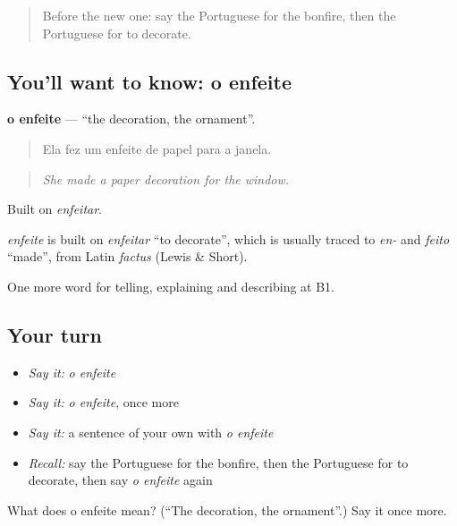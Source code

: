 \label{lesson:PT-C322-enfeite}



\begin{quote}
Before the new one: say the Portuguese for the bonfire, then the Portuguese for to decorate.
\end{quote}

\subsection*{You'll want to know: o enfeite}
\textbf{o enfeite} — \textquotedblleft{}the decoration, the ornament\textquotedblright{}.

\begin{quote}
Ela fez um enfeite de papel para a janela.
\end{quote}

\begin{quote}
\emph{She made a paper decoration for the window.}
\end{quote}

Built on \emph{enfeitar}.

\begin{cousinweb}
\emph{enfeite} is built on \emph{enfeitar} \textquotedblleft{}to decorate\textquotedblright{}, which is usually traced to \emph{en-} and \emph{feito} \textquotedblleft{}made\textquotedblright{}, from Latin \emph{factus} (Lewis \& Short).
\end{cousinweb}

\begin{grammarlens}[title={What you've built}]
One more word for telling, explaining and describing at B1.
\end{grammarlens}

\subsection*{Your turn}
\begin{itemize}
\raggedright
  \item \emph{Say it:} \emph{o enfeite}
  \item \emph{Say it:} \emph{o enfeite}, once more
  \item \emph{Say it:} a sentence of your own with \emph{o enfeite}
  \item \emph{Recall:} say the Portuguese for the bonfire, then the Portuguese for to decorate, then say \emph{o enfeite} again
\end{itemize}

\begin{tcolorbox}[breakable,colback=teal!4,colframe=teal!35!black,title={Before you move on}]
What does o enfeite mean? (\textquotedblleft{}The decoration, the ornament\textquotedblright{}.) Say it once more.
\end{tcolorbox}
